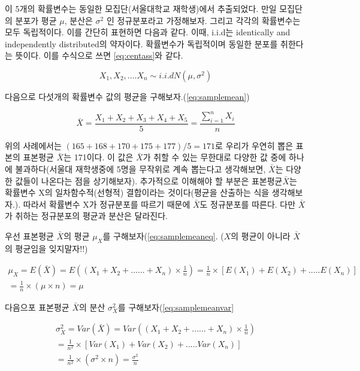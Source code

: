 \documentclass[
]{book}
\begin{document}
이 5개의 확률변수는 동일한 모집단(서울대학교 재학생)에서 추출되었다. 만일 모집단의 분포가 평균 \(μ\), 분산은 \(σ^2\) 인 정규분포라고 가정해보자. 그리고 각각의 확률변수는 모두 독립적이다. 이를 간단히 표현하면 다음과 같다. 이때, i.i.d는 identically and independently distributed의 약자이다. 확률변수가 독립적이며 동일한 분포를 취한다는 뜻이다. 이를 수식으로 쓰면 \eqref{eq:centass}와 같다.

\begin{equation}
X_{1},X_{2},....X_{n} \sim i.i.d N(\mu , \sigma^2)
\label{eq:centass}
\end{equation}

다음으로 다섯개의 확률변수 값의 평균을 구해보자.(\eqref{eq:samplemean})

\begin{equation}
\bar{X}= \frac{X_{1}+X_{2}+X_{3}+X_{4}+X_{5}}{5}= \frac{\sum_{i=1}^{n}X_{i}}{n}
\label{eq:samplemean}
\end{equation}

위의 사례에서는 \((165+168+170+175+177)/5 =171\)로 우리가 우연히 뽑은 표본의 표본평균 \(\bar{X}\)는 171이다. 이 값은 \(\bar{X}\)가 취할 수 있는 무한대로 다양한 값 중에 하나에 불과하다(서울대 재학생중에 5명을 무작위로 계속 뽑는다고 생각해보면, \(\bar{X}\)는 다양한 값들이 나온다는 점을 상기해보자). 추가적으로 이해해야 할 부분은 표본평균\(\bar{X}\)는 확률변수 X의 일차함수적(선형적) 결합이라는 것이다(평균을 산출하는 식을 생각해보자.). 따라서 확률변수 X가 정규분포를 따르기 때문에 \(\bar{X}\)도 정규분포를 따른다. 다만 \(\bar{X}\)가 취하는 정규분포의 평균과 분산은 달라진다.

우선 표본평균 \(\bar{X}\)의 평균 \(\mu_{X}\)를 구해보자(\eqref{eq:samplemeaneq}. (\(X\)의 평균이 아니라 \(\bar{X}\)의 평균임을 잊지말자!!)

\begin{equation}
\begin{array}{cl}
\mu_{X}= E(\bar{X})=E((X_{1}+X_{2}+......+X_{n})\times\frac{1}{n})=\frac{1}{n}\times{[E(X_{1})+E(X_{2})+.....E(X_{n})]}
\\
=\frac{1}{n}\times (\mu\times n)=\mu
\end{array}
\label{eq:samplemeaneq}
\end{equation}

다음으포 표본평균 \(\bar{X}\)의 분산 \(\sigma^{2}_{X}\)를 구해보자(\eqref{eq:samplemeanvar}

\begin{equation}
\begin{array}{cl}
\sigma^{2}_{X}= Var(\bar{X})=Var((X_{1}+X_{2}+......+X_{n})\times\frac{1}{n})
\\
=\frac{1}{n^{2}}\times{[Var(X_{1})+Var(X_{2})+.....Var(X_{n})]}
\\
=\frac{1}{n^{2}}\times (\sigma^{2}\times n)=\frac{\sigma^{2}}{n}
\end{array}
\label{eq:samplemeanvar}
\end{equation}
\end{document}
